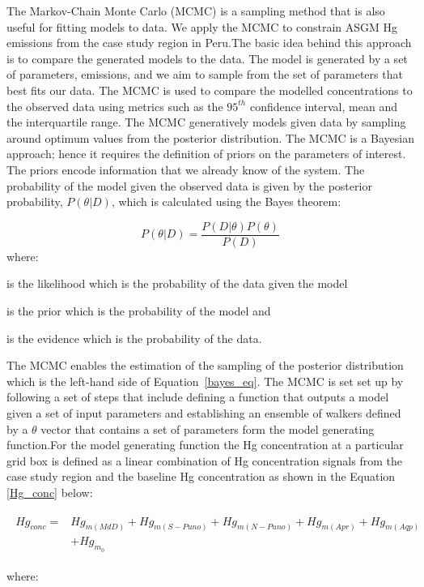 \begin{flushleft}
The Markov-Chain Monte Carlo (MCMC) is a sampling method that is also useful for fitting models to data\cite{hogg_data_2018}. We apply the MCMC to constrain ASGM Hg emissions from the case study region in Peru.The basic idea behind this approach is to compare the generated models to the data. The model is generated by a set of parameters, emissions, and we aim to sample from the set of parameters that best fits our data. The MCMC is used to compare the modelled concentrations to the observed data using metrics such as the $95^{th}$ confidence interval, mean and the interquartile range. The MCMC generatively models given data by sampling around optimum values from the posterior distribution. The MCMC is a Bayesian approach; hence it requires the definition of priors on the parameters of interest. The priors encode information that we already know of the system. The probability of the model given the observed data is given by the posterior probability, $P(\theta|D)$, which is calculated using the Bayes theorem:

\begin{equation}
\label{bayes_eq}
P(\theta|D)=\frac{P(D|\theta)P(\theta)}{P(D)}
\end{equation}
where:
\end{flushleft}

\begin{description}[leftmargin=!,labelwidth={3 em}]
    \item [$P(D|\theta)$] is the likelihood which is the probability of the data given the model
    \item [$P(\theta)$] is the prior which is the probability of the model and 
    \item [$P(D)$] is the evidence which is the probability of the data.
\end{description}

\begin{flushleft}
The MCMC enables the estimation of the sampling of the posterior distribution which is the left-hand side of Equation~\ref{bayes_eq}. The MCMC is set set up by following a set of steps that include defining a function that outputs a model given a set of input parameters and establishing an ensemble of walkers defined by a $\theta$ vector that contains a set of parameters form the model generating function.For the model generating function the Hg concentration at a particular grid box is defined as a linear combination of Hg concentration signals from the case study region and the baseline Hg concentration as shown in the Equation \ref{Hg_conc} below:

\begin{align}
\begin{split}\label{Hg_conc}
Hg_{conc}= {}&Hg_{m(MdD)}+ Hg_{m(S-Puno)} + Hg_{m(N-Puno)} + Hg_{m(Apr)}+ Hg_{m(Aqp)}\\
            & +Hg_{m_0}
\end{split}
\end{align}

where:
\end{flushleft}

